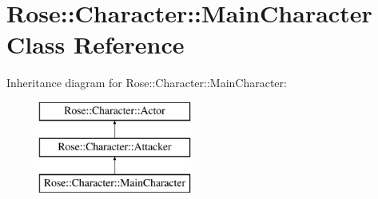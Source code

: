 \hypertarget{classRose_1_1Character_1_1MainCharacter}{}\section{Rose\+::Character\+::Main\+Character Class Reference}
\label{classRose_1_1Character_1_1MainCharacter}
Inheritance diagram for Rose\+::Character\+::Main\+Character\+:\begin{figure}[H]
\begin{center}
\leavevmode
\includegraphics[height=3.000000cm]{classRose_1_1Character_1_1MainCharacter}
\end{center}
\end{figure}
